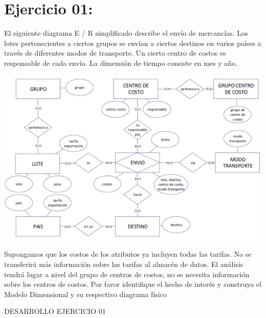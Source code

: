 \section{Ejercicio 01: } 

El siguiente diagrama E / R simplificado describe el envío de mercancías. Los lotes pertenecientes a ciertos grupos se
envían a ciertos destinos en varios países a través de diferentes modos de transporte. Un cierto centro de costos es
responsable de cada envío. La dimensión de tiempo consiste en mes y año.

	\begin{center}
	\includegraphics[width=18cm]{./Imagenes/1}
	\end{center}	

Supongamos que los costos de los atributos ya incluyen todas las tarifas. No se transferirá más información sobre las tarifas
al almacén de datos. El análisis tendrá lugar a nivel del grupo de centros de costos, no se necesita información sobre los
centros de costos.
Por favor identifique el hecho de interés y construya el Modelo Dimensional y su respectivo diagrama físico

DESARROLLO 
EJERCICIO 01

